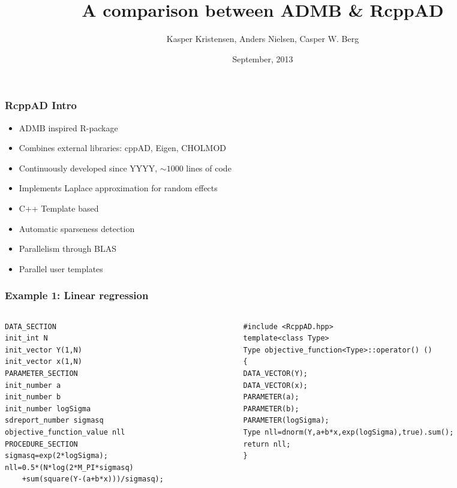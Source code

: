 \documentclass[compress]{beamer}
\title[RcppAD]
{A comparison between ADMB \& RcppAD}
\author[K. Kristensen, A. Nielsen, C.W. Berg ]%
{Kasper Kristensen, Anders Nielsen, Casper W. Berg}
\date[September 2013] %
{September, 2013}
\begin{document}
\begin{frame}[plain]
  \titlepage
\end{frame}

\begin{frame}
\frametitle{RcppAD Intro}

\begin{itemize}
  \item ADMB inspired R-package
  \item Combines external libraries: cppAD, Eigen, CHOLMOD
  \item Continuously developed since YYYY, $\sim 1000$ lines of code
  \item Implements Laplace approximation for random effects
  \item C++ Template based
  \item Automatic sparseness detection
  \item Parallelism through BLAS
  \item Parallel user templates
\end{itemize}


\end{frame}

\begin{frame}[fragile]
  \frametitle{Example 1: Linear regression}
\begin{columns}
    \begin{column}{0.5\textwidth}
\tiny{
\begin{verbatim}
DATA_SECTION
init_int N
init_vector Y(1,N)
init_vector x(1,N)
PARAMETER_SECTION
init_number a
init_number b
init_number logSigma
sdreport_number sigmasq
objective_function_value nll
PROCEDURE_SECTION
sigmasq=exp(2*logSigma);
nll=0.5*(N*log(2*M_PI*sigmasq)
    +sum(square(Y-(a+b*x)))/sigmasq);
\end{verbatim}
}
    \end{column}
\hspace{-50pt}
\vrule{}
    \begin{column}{0.5\textwidth} 
   \tiny{
    \begin{verbatim}
#include <RcppAD.hpp>
template<class Type>
Type objective_function<Type>::operator() ()
{
DATA_VECTOR(Y);
DATA_VECTOR(x);
PARAMETER(a);
PARAMETER(b);
PARAMETER(logSigma);
Type nll=dnorm(Y,a+b*x,exp(logSigma),true).sum();
return nll;
}
    \end{verbatim}
}

\end{column}
\end{columns}
\end{frame}
\end{document}
